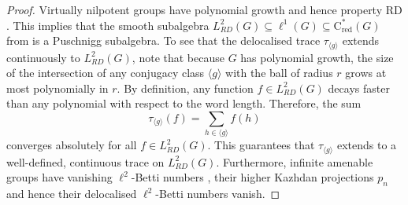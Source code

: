 \documentclass[a4paper,leqno,12pt]{article}
\numberwithin{equation}{section}
\theoremstyle{plain}
\theoremstyle{definition}
\theoremstyle{remark}
\newtheorem{remark}[theoremcounter]{Remark}
\newcommand{\Csr}{\mathrm{C}^*_{\text{red}}}
\begin{document}
	\begin{proof}
		 Virtually nilpotent groups have polynomial growth \cite{gromov81} and hence property RD \cite{jolissaint1990property}. 
         This implies that the smooth subalgebra 
          $L^2_{RD}(G) \subseteq \ell^1(G) \subseteq \Csr(G)$ from \cite{Jolissaint} is a Puschnigg subalgebra. 
          To see that the delocalised trace $\tau_{\langle g \rangle}$ extends continuously to $L_{RD}^2(G)$, note that because $G$ has polynomial growth, the size of the intersection of any conjugacy class $\langle g \rangle$ with the ball of radius $r$ grows at most polynomially in $r$. By definition, any function $f \in L_{RD}^2(G)$ decays faster than any polynomial with respect to the word length. Therefore, the sum
\[
\tau_{\langle g \rangle}(f) = \sum_{h \in \langle g \rangle} f(h)
\]
converges absolutely for all $f \in L_{RD}^2(G)$. This guarantees that $\tau_{\langle g \rangle}$ extends to a well-defined, continuous trace on $L_{RD}^2(G)$.
          Furthermore, infinite amenable groups have vanishing $\ell^2$-Betti numbers \cite{cheegergromov86}, their higher Kazhdan projections $p_n$ and hence their delocalised $\ell^2$-Betti numbers vanish.
	\end{proof}
		
	
\end{document}
